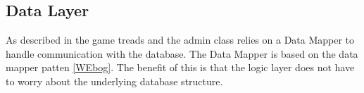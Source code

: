 





\subsection{Data Layer}
As described in  the game treads and the admin class relies on a Data Mapper to handle communication with the database. The Data Mapper is based on the data mapper patten \ref{WEbog}. The benefit of this is that the logic layer does not have to worry about the underlying database structure.

